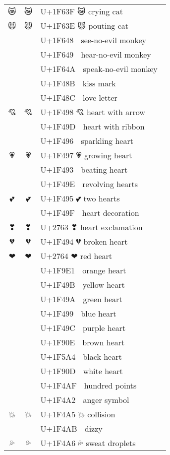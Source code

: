 \documentclass[a4paper,12pt]{ltjarticle}
\newcommand{\fontA}[1]{{\fontspec[RawFeature={mode=harf,+dist,+ccmp}]{Segoe UI Emoji} #1}}
\newcommand{\fontB}[1]{{\fontspec[RawFeature={mode=harf,+dist,+ccmp}]{Noto Color Emoji} #1}}
\begin{document}
\begin{longtable}[c]{ccp{0.8\linewidth}}
\fontA{😿}&\fontB{😿}&U+1F63F 😿 crying cat\\
\fontA{😾}&\fontB{😾}&U+1F63E 😾 pouting cat\\
\fontA{🙈}&\fontB{🙈}&U+1F648 🙈 see-no-evil monkey\\
\fontA{🙉}&\fontB{🙉}&U+1F649 🙉 hear-no-evil monkey\\
\fontA{🙊}&\fontB{🙊}&U+1F64A 🙊 speak-no-evil monkey\\
\fontA{💋}&\fontB{💋}&U+1F48B 💋 kiss mark\\
\fontA{💌}&\fontB{💌}&U+1F48C 💌 love letter\\
\fontA{💘}&\fontB{💘}&U+1F498 💘 heart with arrow\\
\fontA{💝}&\fontB{💝}&U+1F49D 💝 heart with ribbon\\
\fontA{💖}&\fontB{💖}&U+1F496 💖 sparkling heart\\
\fontA{💗}&\fontB{💗}&U+1F497 💗 growing heart\\
\fontA{💓}&\fontB{💓}&U+1F493 💓 beating heart\\
\fontA{💞}&\fontB{💞}&U+1F49E 💞 revolving hearts\\
\fontA{💕}&\fontB{💕}&U+1F495 💕 two hearts\\
\fontA{💟}&\fontB{💟}&U+1F49F 💟 heart decoration\\
\fontA{❣}&\fontB{❣}&U+2763 ❣ heart exclamation\\
\fontA{💔}&\fontB{💔}&U+1F494 💔 broken heart\\
\fontA{❤}&\fontB{❤}&U+2764 ❤ red heart\\
\fontA{🧡}&\fontB{🧡}&U+1F9E1 🧡 orange heart\\
\fontA{💛}&\fontB{💛}&U+1F49B 💛 yellow heart\\
\fontA{💚}&\fontB{💚}&U+1F49A 💚 green heart\\
\fontA{💙}&\fontB{💙}&U+1F499 💙 blue heart\\
\fontA{💜}&\fontB{💜}&U+1F49C 💜 purple heart\\
\fontA{🤎}&\fontB{🤎}&U+1F90E 🤎 brown heart\\
\fontA{🖤}&\fontB{🖤}&U+1F5A4 🖤 black heart\\
\fontA{🤍}&\fontB{🤍}&U+1F90D 🤍 white heart\\
\fontA{💯}&\fontB{💯}&U+1F4AF 💯 hundred points\\
\fontA{💢}&\fontB{💢}&U+1F4A2 💢 anger symbol\\
\fontA{💥}&\fontB{💥}&U+1F4A5 💥 collision\\
\fontA{💫}&\fontB{💫}&U+1F4AB 💫 dizzy\\
\fontA{💦}&\fontB{💦}&U+1F4A6 💦 sweat droplets\\

\end{longtable}
\end{document}
